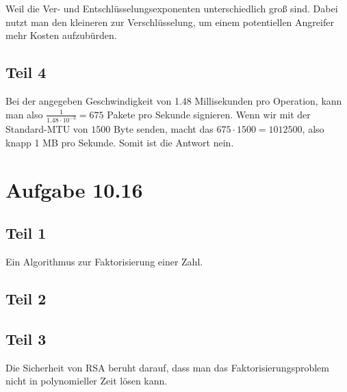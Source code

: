 \documentclass[10pt,a4paper]{article}
\begin{document}
Weil die Ver- und Entschlüsselungsexponenten unterschiedlich groß sind. Dabei
nutzt man den kleineren zur Verschlüsselung, um einem potentiellen Angreifer
mehr Kosten aufzubürden.

\subsection{Teil 4}

Bei der angegeben Geschwindigkeit von 1.48 Millisekunden pro Operation, kann man
also $\frac{1}{1.48 \cdot 10^{-3}} = 675$ Pakete pro Sekunde signieren. Wenn wir
mit der Standard-MTU von $1500$ Byte senden, macht das
$675 \cdot 1500 = 1012500$, also knapp 1 MB pro Sekunde. Somit ist die Antwort
nein.

\section{Aufgabe 10.16}

\subsection{Teil 1}

Ein Algorithmus zur Faktorisierung einer Zahl.

\subsection{Teil 2}

\subsection{Teil 3}

Die Sicherheit von RSA beruht darauf, dass man das Faktorisierungsproblem nicht
in polynomieller Zeit lösen kann.
\end{document}
